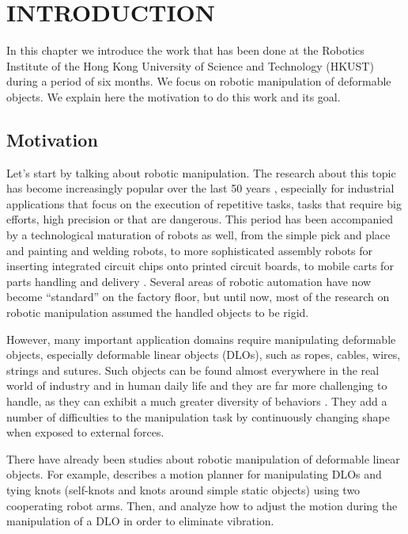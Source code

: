 \chapter{INTRODUCTION}
\label{ch:introduction}
In this chapter we introduce the work that has been done at the Robotics Institute of the Hong Kong University of Science and Technology (HKUST) during a period of six months. We focus on robotic manipulation of deformable objects. We explain here the motivation to do this work and its goal.

\section{Motivation}
Let's start by talking about robotic manipulation. The research about this topic has become increasingly popular over the last 50 years \cite{fanson2010robotic}, especially for industrial applications that focus on the execution of repetitive tasks, tasks that require big efforts, high precision or that are dangerous. This period has been accompanied by a technological maturation of robots as well, from the simple pick and place and painting and welding robots, to more sophisticated assembly robots for inserting integrated circuit chips onto printed circuit boards, to mobile carts for parts handling and delivery \cite{murray2017mathematical}. Several areas of robotic automation have now become \enquote{standard} on the factory floor, but until now, most of the research on robotic manipulation assumed the handled objects to be rigid. 

However, many important application domains require manipulating deformable objects, especially deformable linear objects (DLOs), such as ropes, cables, wires, strings and sutures. Such objects can be found almost everywhere in the real world of industry and in human daily life and they are far more challenging to handle, as they can exhibit a much greater diversity of behaviors \cite{saha2007manipulation}. They add a number of difficulties to the manipulation task by continuously changing shape when exposed to external forces. 

There have already been studies about robotic manipulation of deformable linear objects. For example, \cite{saha2007manipulation} describes a motion planner for manipulating DLOs and tying knots (self-knots and knots around simple static objects) using two cooperating robot arms. Then, \cite{yue2001manipulating} and \cite{yue2002manipulating} analyze how to adjust the motion during the manipulation of a DLO in order to eliminate vibration.

